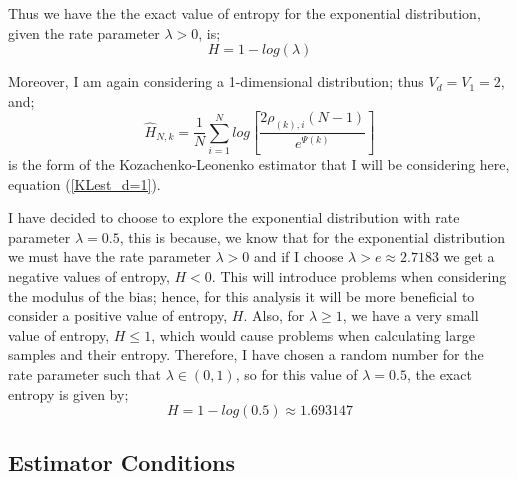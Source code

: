 \documentclass{report}
\begin{document}
Thus we have the the exact value of entropy for the exponential distribution, given the rate parameter $\lambda > 0$, is;
\begin{equation} \label{ExpEnt}
H = 1 - log(\lambda)
\end{equation}

Moreover, I am again considering a 1-dimensional distribution; thus $V_{d} = V_{1} = 2$, and;
\begin{equation}
\hat{H}_{N, k} =  \frac{1}{N} \sum_{i=1}^{N} log \left[ \frac{2\rho_{(k),i}(N-1)}{e^{\Psi(k)}} \right]\nonumber
\end{equation}
is the form of the Kozachenko-Leonenko estimator that I will be considering here, equation (\ref{KLest_d=1}).

I have decided to choose to explore the exponential distribution with rate parameter $\lambda = 0.5$, this is because, we know that for the exponential distribution we must have the rate parameter $\lambda >0$ and if I choose $\lambda > e \approx 2.7183$ we get a negative values of entropy, $H < 0$. This will introduce problems when considering the modulus of the bias; hence, for this analysis it will be more beneficial to consider a positive value of entropy, $H$. Also, for $\lambda \geq 1$, we have a very small value of entropy, $H \leq 1$, which would cause problems when calculating large samples and their entropy. Therefore, I have chosen a random number for the rate parameter such that $\lambda \in (0, 1)$, so for this value of $\lambda=0.5$, the exact entropy is given by;
\begin{equation} \label{exponential_exact}
H = 1 - log(0.5) \approx 1.693147
\end{equation}



\subsection{Estimator Conditions} \label{E_Conditions}
\end{document}
